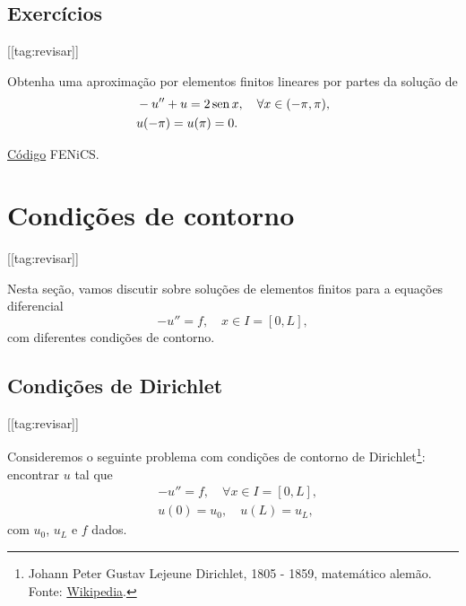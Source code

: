 \subsection*{Exercícios}
[[tag:revisar]]

\begin{exer}\label{exer:dc}
  Obtenha uma aproximação por elementos finitos lineares por partes da solução de
  \begin{align}
    &-u'' + u = 2\operatorname{sen} x,\quad \forall x\in (-\pi, \pi),\\
    &u(-\pi)=u(\pi)=0.
  \end{align}
\end{exer}
\begin{resp}
  \ifispython
  \href{https://github.com/phkonzen/notas/blob/master/src/MetodoElementosFinitos/cap_mef1d/dados/exer_dc/exer_dc.py}{Código} FENiCS.
  \fi
\end{resp}


\section{Condições de contorno}\label{cap_mef1d_sec_cc}
[[tag:revisar]]

Nesta seção, vamos discutir sobre soluções de elementos finitos para a equações diferencial
\begin{equation}
  -u'' = f,\quad x\in I=[0, L],
\end{equation}
com diferentes condições de contorno.

\subsection{Condições de Dirichlet}
[[tag:revisar]]

Consideremos o seguinte problema com condições de contorno de Dirichlet\footnote{Johann Peter Gustav Lejeune Dirichlet, 1805 - 1859, matemático alemão. Fonte: \href{https://en.wikipedia.org/wiki/Peter_Gustav_Lejeune_Dirichlet}{Wikipedia}.}: encontrar $u$ tal que
\begin{align}
  &-u'' = f,\quad \forall x\in I=[0, L],\label{eq:cc_d_eq}\\
  &u(0) = u_0,\quad u(L) = u_L,\label{eq:cc_d_bc}
\end{align}
com $u_0$, $u_L$ e $f$ dados.

